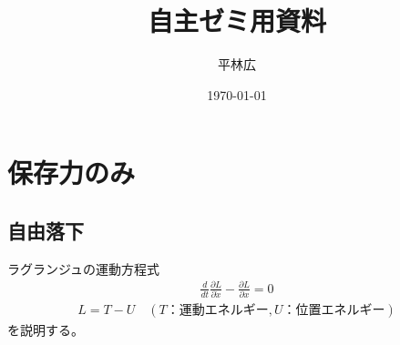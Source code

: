 \documentclass[a4paper,11pt]{jsarticle}
\begin{document}
\title{自主ゼミ用資料}
\author{平林広}
\date{\today}
\maketitle

\section{保存力のみ}

\subsection{自由落下}

ラグランジュの運動方程式
\begin{align*}
  \frac{d}{dt}\frac{\partial L}{\partial \dot{x}} - \frac{\partial L}{\partial x} = 0
\end{align*}
\begin{align*}
  L = T - U \quad (T：運動エネルギー, U：位置エネルギー)
\end{align*}
を説明する。
\end{document}
